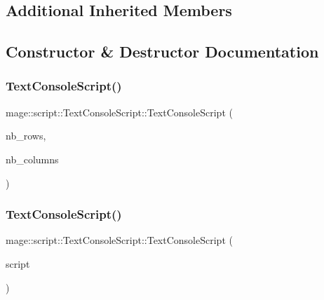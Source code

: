 \subsection*{Additional Inherited Members}


\subsection{Constructor \& Destructor Documentation}
\hypertarget{classmage_1_1script_1_1_text_console_script_a5b26c235c08fb2e443ce3f728985a41e}{}\label{classmage_1_1script_1_1_text_console_script_a5b26c235c08fb2e443ce3f728985a41e} 
\subsubsection{\texorpdfstring{Text\+Console\+Script()}{TextConsoleScript()}\hspace{0.1cm}{\footnotesize\ttfamily [1/3]}}
{\footnotesize\ttfamily mage\+::script\+::\+Text\+Console\+Script\+::\+Text\+Console\+Script (\begin{DoxyParamCaption}\item[{\hyperlink{namespacemage_a41c104c036fba3756a74e19f793eeaa1}{U32}}]{nb\+\_\+rows,  }\item[{\hyperlink{namespacemage_a41c104c036fba3756a74e19f793eeaa1}{U32}}]{nb\+\_\+columns }\end{DoxyParamCaption})\hspace{0.3cm}{\ttfamily [explicit]}}

\hypertarget{classmage_1_1script_1_1_text_console_script_a82c8a2c15aa51befbfe6341e463057db}{}\label{classmage_1_1script_1_1_text_console_script_a82c8a2c15aa51befbfe6341e463057db} 
\subsubsection{\texorpdfstring{Text\+Console\+Script()}{TextConsoleScript()}\hspace{0.1cm}{\footnotesize\ttfamily [2/3]}}
{\footnotesize\ttfamily mage\+::script\+::\+Text\+Console\+Script\+::\+Text\+Console\+Script (\begin{DoxyParamCaption}\item[{const \hyperlink{classmage_1_1script_1_1_text_console_script}{Text\+Console\+Script} \&}]{script }\end{DoxyParamCaption})}


